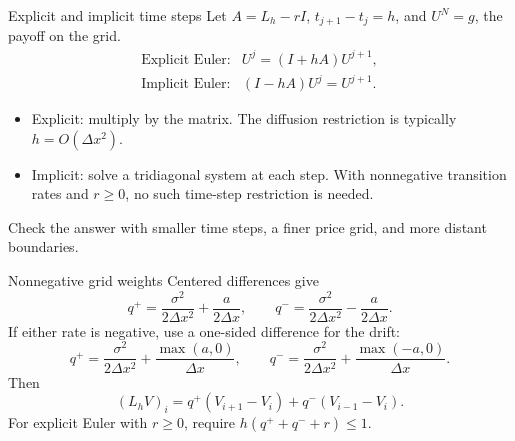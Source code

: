 \documentclass[handout,10pt,t,aspectratio=169]{beamer}
\begin{document}
\begin{frame}{Explicit and implicit time steps}
\small
Let \(A=L_h-rI\), \(t_{j+1}-t_j=h\), and \(U^N=g\), the payoff on the grid.
\[
 \begin{array}{ll}
 \text{Explicit Euler:}&U^j=(I+hA)U^{j+1},\\[.8em]
 \text{Implicit Euler:}&(I-hA)U^j=U^{j+1}.
 \end{array}
\]
\begin{itemize}
\item Explicit: multiply by the matrix. The diffusion restriction is typically
\(h=O(\Delta x^2)\).
\item Implicit: solve a tridiagonal system at each step.
With nonnegative transition rates and \(r\geq0\), no such time-step restriction is needed.
\end{itemize}
Check the answer with smaller time steps, a finer price grid, and more distant boundaries.
\end{frame}

\begin{frame}{Nonnegative grid weights}
\small
Centered differences give
\[
 q^+=\frac{\sigma^2}{2\Delta x^2}+\frac a{2\Delta x},\qquad
 q^-=\frac{\sigma^2}{2\Delta x^2}-\frac a{2\Delta x}.
\]
If either rate is negative, use a one-sided difference for the drift:
\[
 q^+=\frac{\sigma^2}{2\Delta x^2}+\frac{\max(a,0)}{\Delta x},\qquad
 q^-=\frac{\sigma^2}{2\Delta x^2}+\frac{\max(-a,0)}{\Delta x}.
\]
Then
\[
 (L_hV)_i=q^+(V_{i+1}-V_i)+q^-(V_{i-1}-V_i).
\]
For explicit Euler with \(r\geq0\), require \(h(q^++q^-+r)\leq1\).
\end{frame}
\end{document}
